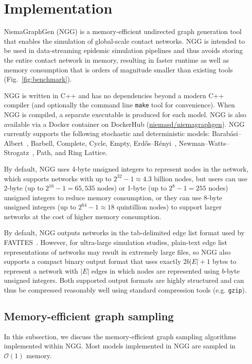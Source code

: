 \documentclass[a4paper,num-refs,gigabyte]{oup-contemporary}
\begin{document}
\section{Implementation}

NiemaGraphGen (NGG) is a memory-efficient undirected graph generation tool that enables the simulation of global-scale contact networks. NGG is intended to be used in data-streaming epidemic simulation pipelines and thus avoids storing the entire contact network in memory, resulting in faster runtime as well as memory consumption that is orders of magnitude smaller than existing tools (Fig.~\ref{fig:benchmark}).

NGG is written in C++ and has no dependencies beyond a modern C++ compiler (and optionally the command line \texttt{make} tool for convenience). When NGG is compiled, a separate executable is produced for each model. NGG is also available via a Docker container on DockerHub (\href{https://hub.docker.com/r/niemasd/niemagraphgen}{niemasd/niemagraphgen}). NGG currently supports the following stochastic and deterministic models: Barab\'asi--Albert~\cite{Barabasi1999}, Barbell, Complete, Cycle, Empty, Erd{\H o}s--R\'enyi~\cite{Erdos1959}, Newman--Watts--Strogatz~\cite{Newman1999}, Path, and Ring Lattice.

By default, NGG uses 4-byte unsigned integers to represent nodes in the network, which supports networks with up to $2^{32}-1\approx4.3$ billion nodes, but users can use 2-byte (up to $2^{16}-1=65,535$ nodes) or 1-byte (up to $2^8-1=255$ nodes) unsigned integers to reduce memory consumption, or they can use 8-byte unsigned integers (up to $2^{64}-1\approx18$ quintillion nodes) to support larger networks at the cost of higher memory consumption.

By default, NGG outputs networks in the tab-delimited edge list format used by FAVITES~\cite{Moshiri2018}. However, for ultra-large simulation studies, plain-text edge list representations of networks may result in extremely large files, so NGG also supports a compact binary output format that uses exactly $2b\left|E\right|+1$ bytes to represent a network with $\left|E\right|$ edges in which nodes are represented using $b$-byte unsigned integers. Both supported output formats are highly structured and can thus be compressed reasonably well using standard compression tools (e.g. \texttt{gzip}).

\subsection{Memory-efficient graph sampling}
In this subsection, we discuss the memory-efficient graph sampling algorithms implemented within NGG. Most models implemented in NGG are sampled in $\mathcal{O}\left(1\right)$ memory.
\end{document}
